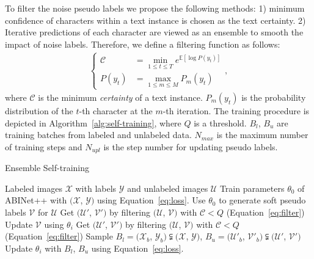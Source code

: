 \documentclass[10pt,journal,compsoc]{IEEEtran}
\begin{document}
To filter the noise pseudo labels we propose the following methods: 1) minimum confidence of characters within a text instance is chosen as the text certainty. 2) Iterative predictions of each character are viewed as an ensemble to smooth the impact of noise labels. Therefore, we define a filtering function as follows:
\begin{align}
\begin{cases}
\mathcal{C} &= \min\limits_{1 \le t \le T} e^{\mathbb{E}[\log{P(y_t)}]} \\ 
P(y_t) &= \max\limits_{1 \le m \le M} P_m(y_t) 
\end{cases},
\label{eq:filter}
\end{align}
where $\mathcal{C}$ is the minimum \emph{certainty} of a text instance. $P_m(y_t)$ is the probability distribution of the $t$-th character at the $m$-th iteration. The training procedure is depicted in Algorithm~\ref{alg:self-training}, where $Q$ is a threshold. $B_l$, $B_u$ are training batches from labeled and unlabeled data. $N_{max}$ is the maximum number of training steps and $N_{upl}$ is the step number for updating pseudo labels.  


\begin{algorithm}[t]
   \scriptsize
   \caption{Ensemble Self-training}
   \begin{algorithmic}[1]
      \Require Labeled images $\mathcal{X}$ with labels $\mathcal{Y}$ and unlabeled images $\mathcal{U}$
      \State Train parameters $\theta_0$ of ABINet++ with $(\mathcal{X}$, $\mathcal{Y})$ using Equation~\ref{eq:loss}.
      \State Use $\theta_0$ to generate soft pseudo labels $\mathcal{V}$ for $\mathcal{U}$
      \State Get $(\mathcal{U}'$, $\mathcal{V}')$ by filtering $(\mathcal{U}$, $\mathcal{V})$ with $\mathcal{C}<Q$ (Equation~\ref{eq:filter})
            \State Update $\mathcal{V}$ using $\theta_i$
            \State Get $(\mathcal{U}'$, $\mathcal{V}')$ by filtering $(\mathcal{U}$, $\mathcal{V})$ with $\mathcal{C}<Q$ (Equation~\ref{eq:filter})
         \EndIf
         \State Sample $B_l=(\mathcal{X}_{b}$, $\mathcal{Y}_{b}) \subsetneqq (\mathcal{X}$, $\mathcal{Y})$, $B_u=(\mathcal{U}'_{b}$, $\mathcal{V}'_{b}) \subsetneqq (\mathcal{U}'$, $\mathcal{V}')$
         \State Update $\theta_i$ with $B_l$, $B_u$ using Equation~\ref{eq:loss}.
      \EndFor
   \end{algorithmic}
   \label{alg:self-training}
\end{algorithm}
\end{document}
